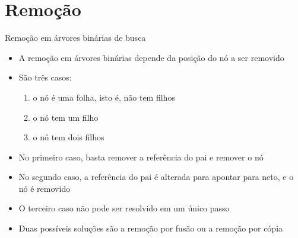 \section{Remoção}

\begin{frame}[fragile]{Remoção em árvores binárias de busca}

    \begin{itemize}
	    \item A remoção em árvores binárias { depende da posição do nó} a ser removido

        \item São { três} casos:

        \begin{enumerate}
            \item o nó é uma folha, isto é, não tem filhos

            \item o nó tem um filho

            \item o nó tem dois filhos
        \end{enumerate}

        \item No primeiro caso, basta { remover} a referência do pai e {remover} o nó

        \item No segundo caso, a referência do { pai} é alterada para apontar para neto, e o nó é removido

        \item O terceiro caso não pode ser resolvido em um único passo

        \item Duas possíveis soluções são a remoção por fusão ou a remoção por cópia
    \end{itemize}
\end{frame} 

